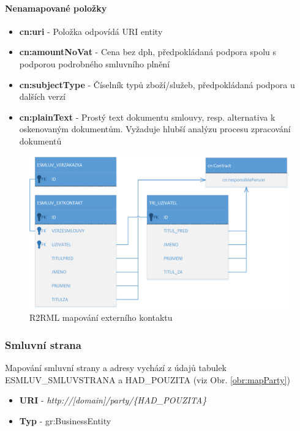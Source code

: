 \paragraph*{Nenamapované položky}
\begin{itemize}
\item \textbf{cn:uri} - Položka odpovídá URI entity
\item \textbf{cn:amountNoVat} - Cena bez dph, předpokládaná podpora spolu s podporou podrobného smluvního plnění
\item \textbf{cn:subjectType} - Číselník typů zboží/služeb, předpokládaná podpora u dalších verzí
\item \textbf{cn:plainText} - Prostý text dokumentu smlouvy, resp. alternativa k oskenovaným dokumentům. Vyžaduje hlubší analýzu procesu zpracování dokumentů 
\end{itemize}

\begin{figure}[H]
\centerline{\includegraphics[width=\textwidth]{img/mapRespPerson.eps}}
\caption{R2RML mapování externího kontaktu}
\label{obr:mapRespPerson}
\end{figure}

\subsubsection{Smluvní strana}

Mapování smluvní strany a adresy vychází z údajů tabulek \\ESMLUV\_SMLUVSTRANA a HAD\_POUZITA (viz Obr. \ref{obr:mapParty})

\begin{itemize}
\item \textbf{URI} - \textit{http://[domain]/party/\{HAD\_POUZITA\}}
\item \textbf{Typ} - gr:BusinessEntity
\end{itemize}

